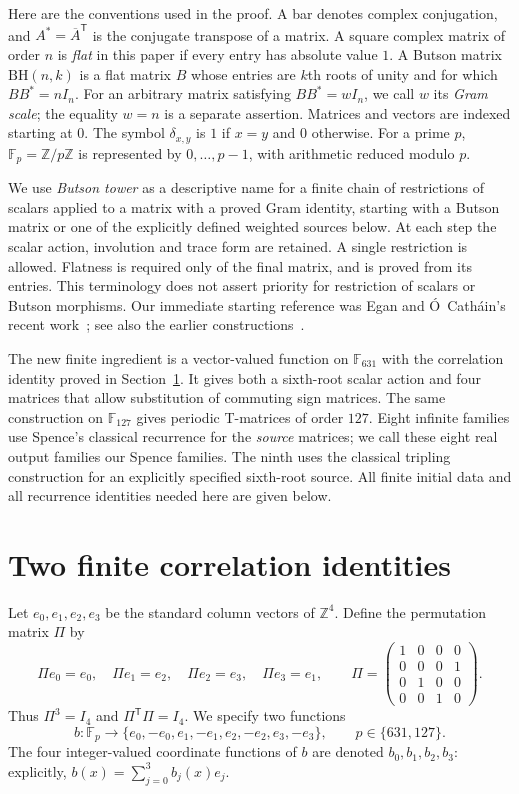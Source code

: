 \documentclass[10pt]{article}
\newcommand{\F}{\mathbb F}
\begin{document}
Here are the conventions used in the proof. A bar denotes complex
conjugation, and $A^*=\overline A^{\mathsf T}$ is the conjugate transpose
of a matrix. A square complex matrix of order $n$ is \emph{flat} in this
paper if every entry has absolute value $1$. A Butson matrix
$\mathrm{BH}(n,k)$ is a flat matrix $B$ whose entries are $k$th roots of
unity and for which $BB^*=nI_n$.
For an arbitrary matrix satisfying $BB^*=wI_n$, we call $w$ its
\emph{Gram scale}; the equality $w=n$ is a separate assertion.
Matrices and vectors are indexed starting at $0$.
The symbol $\delta_{x,y}$ is $1$ if $x=y$ and $0$ otherwise.
For a prime $p$, $\F_p=\mathbb Z/p\mathbb Z$ is represented by
$0,\ldots,p-1$, with arithmetic reduced modulo $p$.

We use \emph{Butson tower} as a descriptive name for a finite chain of
restrictions of scalars applied to a matrix with a proved Gram identity,
starting with a Butson matrix or one of the explicitly defined weighted
sources below. At each step the scalar action, involution and trace form
are retained. A single restriction is allowed. Flatness is required only
of the final matrix, and is proved from its entries. This terminology
does not assert priority for restriction of scalars or Butson morphisms.
Our immediate starting reference was Egan and \'{O}~Cath\'ain's recent
work~\cite{complete-morphisms}; see also the earlier
constructions~\cite{morphisms,matrix-homomorphisms,unreal}.

The new finite ingredient is a vector-valued function on $\F_{631}$
with the correlation identity proved in Section~\ref{sec:finite}.
It gives both a sixth-root scalar action and four matrices that allow
substitution of commuting sign matrices. The same construction on
$\F_{127}$ gives periodic T-matrices of order $127$.
Eight infinite families use Spence's classical recurrence for the
\emph{source} matrices; we call these eight real output families
our Spence families. The ninth uses the classical tripling construction
for an explicitly specified sixth-root source. All finite initial data and all
recurrence identities needed here are given below.

\section{Two finite correlation identities}\label{sec:finite}

Let $e_0,e_1,e_2,e_3$ be the standard column vectors of $\mathbb Z^4$.
Define the permutation matrix $\Pi$ by
\[
 \Pi e_0=e_0,\quad \Pi e_1=e_2,\quad
 \Pi e_2=e_3,\quad \Pi e_3=e_1,
 \qquad
 \Pi=\begin{pmatrix}1&0&0&0\\0&0&0&1\\0&1&0&0\\0&0&1&0\end{pmatrix}.
\]
Thus $\Pi^3=I_4$ and $\Pi^{\mathsf T}\Pi=I_4$.
We specify two functions
\[
 b\colon\F_p\longrightarrow\{e_0,-e_0,e_1,-e_1,e_2,-e_2,e_3,-e_3\},
 \qquad p\in\{631,127\}.
\]
The four integer-valued coordinate functions of $b$ are denoted
$b_0,b_1,b_2,b_3$: explicitly, $b(x)=\sum_{j=0}^3b_j(x)e_j$.
\end{document}
